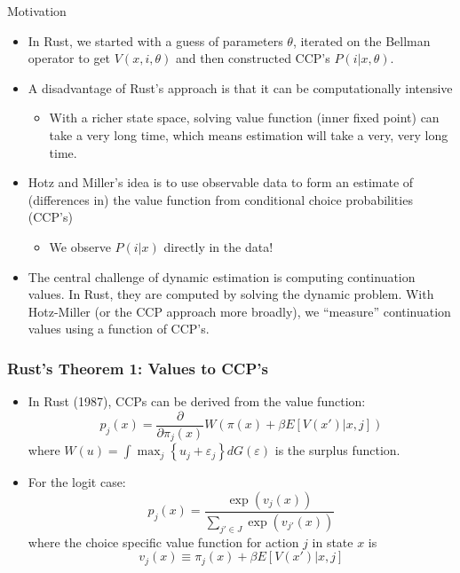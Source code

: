 \documentclass[xcolor=pdftex,dvipsnames,table,mathserif]{beamer}
\begin{document}
\begin{frame}{Motivation}
\begin{itemize}
	\item In Rust, we started with a guess of parameters $\theta$, iterated on the Bellman operator to get $V(x,i,\theta)$ and then constructed CCP's $P(i | x, \theta)$.
	\item A disadvantage of Rust's approach is that it can be computationally intensive
	\begin{itemize}
	
		\item With a richer state space, solving value function (inner fixed point) 
		can take a very long time,
		which means estimation will take a very, very long time.
	\end{itemize}
	\item Hotz and Miller's idea is to use observable data to form an estimate 
	of (differences in) the value function from conditional choice probabilities (CCP's)
\begin{itemize}
\item We observe $P(i | x)$ directly in the data!
\end{itemize}
	
	\item The central challenge of dynamic estimation is computing continuation values. 
	In Rust, they are computed by solving the dynamic problem.
	With Hotz-Miller (or the CCP approach more broadly), we ``measure'' continuation
	values using a function of CCP's.
	
\end{itemize}
\end{frame}

\begin{frame}
\frametitle{Rust's Theorem 1: Values to CCP's}
\begin{itemize}
	\item In Rust (1987), CCPs can be derived from the value function:\[
		p_{j}\left( x\right) = \frac{\partial}{\partial \pi_{j} \left(x \right)} W\left( \pi\left( x \right) 
		+\beta E\left[V\left(x' \right)|x,j\right]\right)
	\]
	where  $W\left(u\right) = \int \max_{j} \left\{ u_{j} +\varepsilon_{j}\right\}dG\left( \varepsilon\right)$ is the surplus function.

	\medskip
	\item For the logit case:\[
	p_{j}\left(x\right) = \frac{\exp\left(v_{j}\left(x\right)\right)}{\sum_{j'\in J}\exp\left(v_{j'}\left(x\right)\right)}
	\]
	where the choice specific value function for action $j$ in state $x$ is \[
	v_{j}\left(x\right) \equiv \pi_{j}\left(x\right)+\beta E\left[V\left(x' \right)|x,j\right]
	\]
\end{itemize}
\end{frame}
\end{document}
